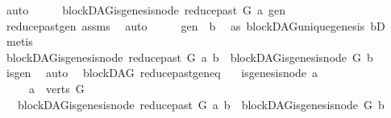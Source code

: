 \begin{isabellebody}
\ auto\isanewline
\ \ \isamarkupfalse%
\ \isamarkupfalse%
\ {\isachardoublequoteopen}blockDAG{\isachardot}{\kern0pt}is{\isacharunderscore}{\kern0pt}genesis{\isacharunderscore}{\kern0pt}node\ {\isacharparenleft}{\kern0pt}reduce{\isacharunderscore}{\kern0pt}past\ G\ a{\isacharparenright}{\kern0pt}\ gen{\isachardoublequoteclose}\ \isamarkupfalse%
\ reduce{\isacharunderscore}{\kern0pt}past{\isacharunderscore}{\kern0pt}gen\ assms\ \isamarkupfalse%
\ auto\isanewline
\ \ \isamarkupfalse%
\ \isamarkupfalse%
\ {\isachardoublequoteopen}gen\ {\isacharequal}{\kern0pt}\ b{\isachardoublequoteclose}\ \isamarkupfalse%
\ as{}\ blockDAG{\isachardot}{\kern0pt}unique{\isacharunderscore}{\kern0pt}genesis\ bD\ \isamarkupfalse%
\ metis\isanewline
\ \ \isamarkupfalse%
\ \isamarkupfalse%
\ {\isachardoublequoteopen}blockDAG{\isachardot}{\kern0pt}is{\isacharunderscore}{\kern0pt}genesis{\isacharunderscore}{\kern0pt}node\ {\isacharparenleft}{\kern0pt}reduce{\isacharunderscore}{\kern0pt}past\ G\ a{\isacharparenright}{\kern0pt}\ b\ {\isasymLongrightarrow}\ blockDAG{\isachardot}{\kern0pt}is{\isacharunderscore}{\kern0pt}genesis{\isacharunderscore}{\kern0pt}node\ G\ b{\isachardoublequoteclose}\isanewline
\ \ \ \ \isamarkupfalse%
\ is{\isacharunderscore}{\kern0pt}gen\ \isamarkupfalse%
\ auto\isanewline
{}\isamarkupfalse%
%
\endisatagproof
{\isafoldproof}%
%
\isadelimproof
\isanewline
%
\endisadelimproof
\isanewline
{}\isamarkupfalse%
\ {\isacharparenleft}{\kern0pt}\ blockDAG{\isacharparenright}{\kern0pt}\ reduce{\isacharunderscore}{\kern0pt}past{\isacharunderscore}{\kern0pt}gen{\isacharunderscore}{\kern0pt}eq{\isacharcolon}{\kern0pt}\isanewline
\ \ \ {\isachardoublequoteopen}{\isasymnot}is{\isacharunderscore}{\kern0pt}genesis{\isacharunderscore}{\kern0pt}node\ a{\isachardoublequoteclose}\ \isanewline
\ \ \ \ \ {\isachardoublequoteopen}a\ {\isasymin}\ verts\ G{\isachardoublequoteclose}\isanewline
\ \ \ {\isachardoublequoteopen}blockDAG{\isachardot}{\kern0pt}is{\isacharunderscore}{\kern0pt}genesis{\isacharunderscore}{\kern0pt}node\ {\isacharparenleft}{\kern0pt}reduce{\isacharunderscore}{\kern0pt}past\ G\ a{\isacharparenright}{\kern0pt}\ b\ {\isacharequal}{\kern0pt}\ blockDAG{\isachardot}{\kern0pt}is{\isacharunderscore}{\kern0pt}genesis{\isacharunderscore}{\kern0pt}node\ G\ b{\isachardoublequoteclose}\isanewline

\end{isabellebody}
